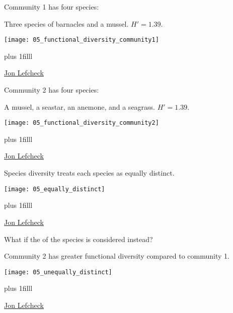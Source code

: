 \documentclass[t]{beamer}
\begin{document}
%
\begin{frame}[t]{Community 1 has four species:}

	\hspace*{1.5em}Three species of barnacles and a mussel. {\small $H' = 1.39.$}

	\centering\texttt{[image: 05\_functional\_diversity\_community1]}

	\vskip0pt plus 1filll
	
	\hfill\tiny \href{https://jonlefcheck.net/2014/10/20/what-is-functional-diversity-and-why-do-we-care-2/}{\textcopyright Jon Lefcheck}

\end{frame}
%
\begin{frame}[t]{Community 2 has four species:}

	\hspace*{1.5em}A mussel, a seastar, an anemone, and a seagrass.  {\small $H' = 1.39.$}

	\centering\texttt{[image: 05\_functional\_diversity\_community2]}

	\vskip0pt plus 1filll
	
	\hfill\tiny \href{https://jonlefcheck.net/2014/10/20/what-is-functional-diversity-and-why-do-we-care-2/}{\textcopyright Jon Lefcheck}

\end{frame}
%
\begin{frame}[t]{Species diversity treats each species as equally distinct.}

	{\centering\texttt{[image: 05\_equally\_distinct]}\par}
	
	\vskip0pt plus 1filll
	
	\hfill\tiny \href{https://jonlefcheck.net/2014/10/20/what-is-functional-diversity-and-why-do-we-care-2/}{\textcopyright Jon Lefcheck}
	
\end{frame}
%
\begin{frame}[t]{What if the  of the species is considered instead?}

	\begin{multicols}{2}
	
	Community 2 has greater functional diversity compared to
	community 1.
	
	\columnbreak
	
	\texttt{[image: 05\_unequally\_distinct]}
	
	\end{multicols}
	
	\vskip0pt plus 1filll
	
	\hfill\tiny \href{https://jonlefcheck.net/2014/10/20/what-is-functional-diversity-and-why-do-we-care-2/}{\textcopyright Jon Lefcheck}
	
\end{frame}
\end{document}
